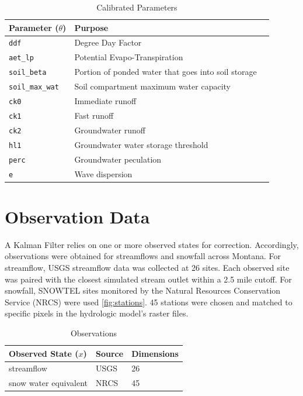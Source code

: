 \begin{table}[]
\caption{Calibrated Parameters} 
\begin{tabular}{lll}
Parameter ($\theta$) & Purpose \\ \hline
\texttt{ddf}                  & Degree Day Factor \\
\texttt{aet\_lp}              & Potential Evapo-Transpiration  \\
\texttt{soil\_beta}          & Portion of ponded water that goes into soil storage \\
\texttt{soil\_max\_wat}       & Soil compartment maximum water capacity \\
\texttt{ck0}       & Immediate runoff \\
\texttt{ck1}      & Fast runoff \\
\texttt{ck2}       & Groundwater runoff \\
\texttt{hl1}       & Groundwater water storage threshold \\
\texttt{perc}       & Groundwater peculation \\
\texttt{e}       & Wave dispersion \\
\end{tabular}
\label{tab:t_params}
\end{table}



\section{Observation Data}

A Kalman Filter relies on one or more observed states for correction. Accordingly, observations were obtained for streamflows and snowfall across Montana. For streamflow, USGS streamflow data was collected at 26 sites. Each observed site was paired with the closest simulated stream outlet within a 2.5 mile cutoff. For snowfall, SNOWTEL sites monitored by the Natural Resources Conservation Service (NRCS) were used \ref{fig:stations}. 45 stations were chosen and matched to specific pixels in the hydrologic model's raster files.


\begin{table}[]
\caption{Observations} 
\begin{tabular}{lll}
Observed State ($x$) & Source                              & Dimensions  \\ \hline
streamflow  & USGS & 26   \\
snow water equivalent         & NRCS & 45
\end{tabular}
\label{tab:obs}
\end{table}

